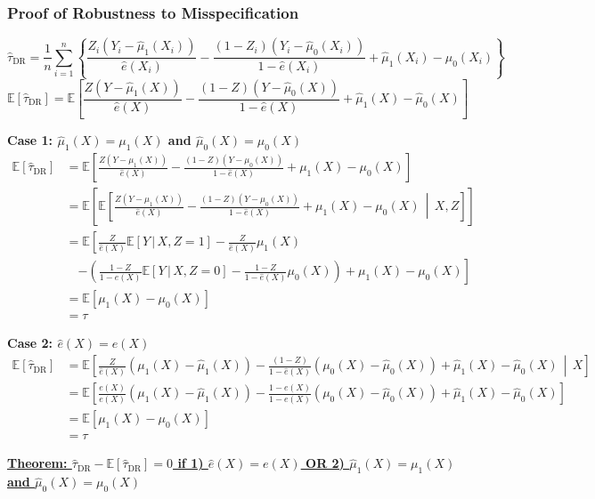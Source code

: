 \subsubsection{Proof of Robustness to Misspecification}
\[\hat{\tau}_{\text{DR}} = \frac{1}{n} \sum_{i=1}^{n} \left\{\frac{Z_i(Y_i - \hat{\mu}_1(X_i))}{\hat{e}(X_i)} - \frac{(1 - Z_i)(Y_i - \hat{\mu}_0(X_i))}{1 - \hat{e}(X_i)} + \hat{\mu}_1(X_i) - \hat{\mu}_0(X_i)\right\}\]
\[\mathbb{E}\left[\hat{\tau}_{\text{DR}}\right] = \mathbb{E}\left[\frac{Z(Y - \hat{\mu}_1(X))}{\hat{e}(X)} - \frac{(1 - Z)(Y - \hat{\mu}_0(X))}{1 - \hat{e}(X)} + \hat{\mu}_1(X) - \hat{\mu}_0(X)\right]\]

\textbf{Case 1: $\hat{\mu}_1(X) = \mu_1(X)$ and $\hat{\mu}_0(X) = \mu_0(X)$}
\begin{align*}
    \mathbb{E}\left[\hat{\tau}_{\text{DR}}\right] &= \mathbb{E}\left[\frac{Z(Y - \mu_1(X))}{\hat{e}(X)} - \frac{(1 - Z)(Y - \mu_0(X))}{1 - \hat{e}(X)} + \mu_1(X) - \mu_0(X)\right] \\
    &= \mathbb{E}\left[\mathbb{E}\left[\frac{Z(Y - \mu_1(X))}{\hat{e}(X)} - \frac{(1 - Z)(Y - \mu_0(X))}{1 - \hat{e}(X)} + \mu_1(X) - \mu_0(X) \, \middle| \, X, Z\right]\right] \\
    &= \mathbb{E}\left[\frac{Z}{\hat{e}(X)}\mathbb{E}[Y \, | \, X, Z = 1] - \frac{Z}{\hat{e}(X)}\mu_1(X)\right. \\
    &\quad \left. - \left(\frac{1 - Z}{1 - \hat{e}(X)}\mathbb{E}[Y \, | \, X, Z = 0] - \frac{1 - Z}{1 - \hat{e}(X)}\mu_0(X)\right) + \mu_1(X) - \mu_0(X)\right] \\
    &= \mathbb{E}[\mu_1(X) - \mu_0(X)] \\
    &= \tau
\end{align*}

\textbf{Case 2: $\hat{e}(X) = e(X)$}
\begin{align*}
    \mathbb{E}\left[\hat{\tau}_{\text{DR}}\right] &= \mathbb{E}\left[\frac{Z}{\hat{e}(X)}(\mu_1(X) - \hat{\mu}_1(X)) - \frac{(1 - Z)}{1 - \hat{e}(X)}(\mu_0(X) - \hat{\mu}_0(X)) + \hat{\mu}_1(X) - \hat{\mu}_0(X) \, \middle| \, X\right] \\
    &= \mathbb{E}\left[\frac{e(X)}{e(X)}(\mu_1(X) - \hat{\mu}_1(X)) - \frac{1-e(X)}{1-e(X)}(\mu_0(X) - \hat{\mu}_0(X)) + \hat{\mu}_1(X) - \hat{\mu}_0(X)\right] \\
    &= \mathbb{E}[\mu_1(X) - \mu_0(X)] \\
    &= \tau
\end{align*}

\underline{\textbf{Theorem: $\hat{\tau}_{\text{DR}} - \mathbb{E}[\hat{\tau}_{\text{DR}}] = 0$ if 1) $\hat{e}(X) = e(X)$ OR 2) $\hat{\mu}_1(X) = \mu_1(X)$ and $\hat{\mu}_0(X) = \mu_0(X)$}}

